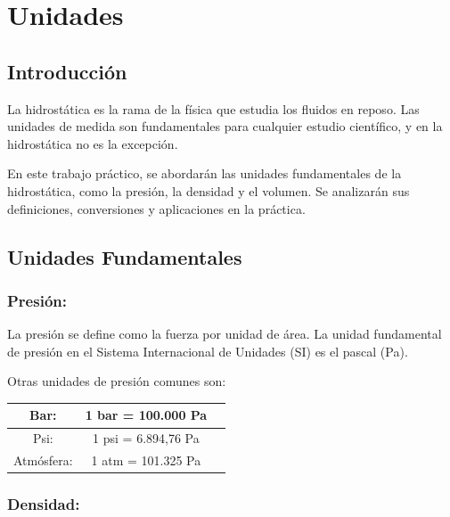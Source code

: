 \documentclass[../main]{subfiles}
\begin{document}
\chapter{Unidades}

\section{Introducción}

La hidrostática es la rama de la física que estudia los fluidos en
reposo. Las unidades de medida son fundamentales para cualquier
estudio científico, y en la hidrostática no es la excepción.

En este trabajo práctico, se abordarán las unidades fundamentales de
la hidrostática, como la presión, la densidad y el volumen. Se
analizarán sus definiciones, conversiones y aplicaciones en la práctica.

\section{Unidades Fundamentales}

\subsection{Presión:}

La presión se define como la fuerza por unidad de área. La unidad
fundamental de presión en el Sistema Internacional de Unidades (SI)
es el pascal (Pa).

Otras unidades de presión comunes son:

\begin{table}[ht!]
  \centering
  \begin{tabular}{|c|c|c|} \hline
    Bar:&1 bar = 100.000 Pa \\ \hline
    Psi:&1 psi = 6.894,76 Pa\\ \hline
    Atmósfera:&1 atm = 101.325 Pa \\ \hline
  \end{tabular}
\end{table}
\subsection{Densidad:}
\end{document}
